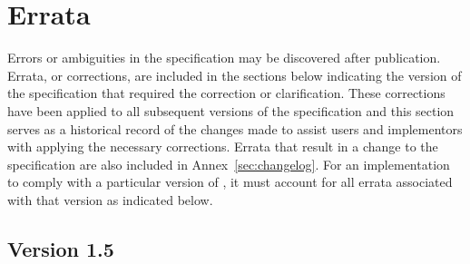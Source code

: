 \chapter{Errata}\label{sec:errata}

Errors or ambiguities in the \openshmem specification may be discovered after
publication.
Errata, or corrections, are included in the sections below indicating the
version of the \openshmem specification that required the correction or
clarification.
These corrections have been applied to all subsequent versions of the
specification and this section serves as a historical record of the changes
made to assist users and implementors with applying the necessary corrections.
Errata that result in a change to the specification are also included in
Annex~\ref{sec:changelog}.
For an implementation to comply with a particular version of \openshmem, it
must account for all errata associated with that version as indicated below.

\section{Version 1.5}

